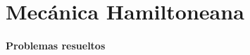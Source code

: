 \documentclass[/home/hernan/Documentos/Apuntes_mecanica_teorica/main.tex]{subfiles}
\begin{document}
    \part{Mecánica Hamiltoneana}

    \subsection{Problemas resueltos}
    
\end{document}
